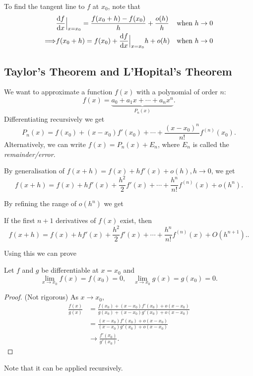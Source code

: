 \documentclass[10pt]{article}
\begin{document}
    To find the tangent line to $f$ at $x_0$, note that 
    \[
        \begin{aligned}
             & \frac{\mathrm{d}f}{\mathrm{d}x}\Big|_{x=x_0} = \frac{f(x_0+h)-f(x_0)}{h}+ \frac{o(h)}{h} & \text{when $ h \to 0$} \\
             \Longrightarrow & f(x_0+h) = f(x_0)+\frac{\mathrm{d}f}{\mathrm{d}x}\Big|_{x=x_0} h + o(h)& \text{when $ h \to 0$} \\
        \end{aligned}
    \]
    \subsection{Taylor's Theorem and L'Hopital's Theorem}
    We want to approximate a function $f(x)$ with a polynomial of order $n$:
    \[
        f(x) = \underbrace{a_0+a_1x+\cdots+a_nx^n}_{P_n(x)}
    .\]
    Differentiating recursively we get 
    \begin{equation}\label{eq:taylor_series}
        P_n(x) = f(x_0)+(x-x_0)f'(x_0)+\cdots+\frac{(x-x_0)^n}{n!}f^{(n)}(x_0).
    \end{equation}
    Alternatively, we can write $ f(x) = P_n(x)+E_n $, where $E_n$ is called the \textit{remainder/error}.

    By generalisation of $ f(x+h) = f(x) + hf'(x)+o(h), h\to 0 $, we get 
    \begin{equation}\label{eq:taylor_series_with_remainder}
        f(x+h) = f(x)+hf'(x)+\frac{h^2}{2}f'(x)+\cdots+\frac{h^n}{n!}f^{(n)}(x)+o(h^n).
    \end{equation}

    By refining the range of $o(h^n)$ we get
    \begin{theorem}[Taylor]\label{thm:taylor_theorem}
        If the first $n+1$ derivatives of $f(x)$ exist, then 
        \[
            f(x+h) = f(x)+hf'(x)+\frac{h^2}{2}f'(x)+\cdots+\frac{h^n}{n!}f^{(n)}(x)+O(h^{n+1}).
        .\]
    \end{theorem}

    Using this we can prove 
    \begin{theorem}[L'Hopital]\label{thm:L'Hopital}
        Let $f$ and $g$ be differentiable at $x=x_0$ and
        \[
            \lim_{x \to x_0} f(x)=f(x_0)=0, \quad \lim_{x \to x_0} g(x)=g(x_0)=0
        .\]
    \end{theorem}
    \begin{proof}(Not rigorous)
        As $x\to x_0$, 
        \[
            \begin{aligned}
                 \frac{f(x)}{g(x)} &= \frac{f(x_0)+(x-x_0)f'(x_0)+o(x-x_0)}{g(x_0)+(x-x_0)g'(x_0)+o(x-x_0)}\\
                 &= \frac{(x-x_0)f'(x_0)+o(x-x_0)}{(x-x_0)g'(x_0)+o(x-x_0)}\\
                 &\to \frac{f'(x_0)}{g'(x_0)}.
            \end{aligned}
        \]
    \end{proof}
    Note that it can be applied recursively.
\end{document}
